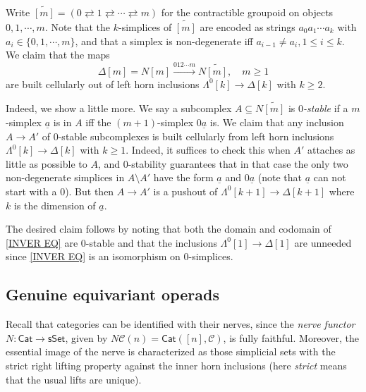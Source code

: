 \documentclass[a4paper,10pt
,draft
]{article}%
\begin{document}
\begin{remark}\label{CONTGR REM}
Write 
$\widetilde{[m]} = 
(0 \rightleftarrows 1 
\rightleftarrows \cdots 
\rightleftarrows m)$
for the contractible groupoid on objects $0,1,\cdots,m$. Note that the $k$-simplices of $\widetilde{[m]}$
are encoded as strings $a_0 a_1 \cdots a_k$
with $a_{i} \in \{0,1,\cdots,m\}$, and that a simplex is non-degenerate iff $a_{i-1}\not = a_{i}, 1 \leq i \leq k$.
We claim that the maps
\begin{equation}\label{INVER EQ}
	\Delta[m] = N [m] \xrightarrow{012\cdots m} N \widetilde{[m]},\quad m \geq 1
\end{equation}
are built cellularly out of left horn inclusions $\Lambda^{0}[k] \to \Delta[k]$ with $k\geq 2$.

Indeed, we show a little more. We say a subcomplex 
$A \subseteq N \widetilde{[m]}$ is \textit{$0$-stable}
if a $m$-simplex $\underline{a}$ is in $A$ iff the $(m+1)$-simplex $0\underline{a}$ is.
We claim that any inclusion $A \to A'$ of $0$-stable subcomplexes is built cellularly from left horn inclusions $\Lambda^{0}[k] \to \Delta[k]$ with $k\geq 1$.
Indeed, it suffices to check this when $A'$ attaches as little as 
possible to $A$, and $0$-stability guarantees that in that case the only two non-degenerate simplices in $A \setminus A'$
have the form 
$\underline{a}$ and $0\underline{a}$
(note that $\underline{a}$ can not start with a $0$).
But then $A\to A'$ is a pushout of 
$\Lambda^{0}[k+1] \to \Delta[k+1]$ where $k$ is the dimension of $\underline{a}$.

The desired claim follows by noting that both the domain and codomain of \eqref{INVER EQ} are $0$-stable and that the  inclusions 
$\Lambda^0[1] \to \Delta[1]$ are unneeded since \eqref{INVER EQ} is an isomorphism on $0$-simplices.
\end{remark}



\subsection{Genuine equivariant operads}\label{GENEQOP SEC}


Recall that categories can be identified with their nerves, since the \textit{nerve functor}
$N \colon \mathsf{Cat} \to \mathsf{sSet}$, 
given by $N\mathcal C (n) = \mathsf{Cat}([n], \mathcal C)$, 
is fully faithful.
Moreover, the essential image of the nerve is characterized as those simplicial sets
with the strict right lifting property 
against the inner horn inclusions \cite[Prop. 1.1.2.2]{Lur09}
(here \textit{strict} means that the usual lifts are unique).
\end{document}
